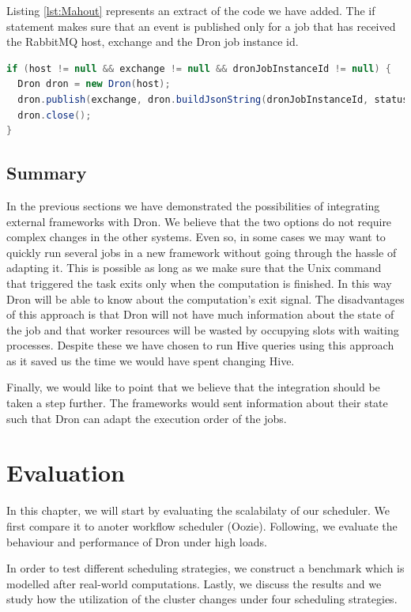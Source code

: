 \documentclass[11pt,a4paper,twoside]{report}
\begin{document}
Listing \ref{lst:Mahout} represents an extract of the code we have added. The if statement makes sure that an event is published only for a job that has received the RabbitMQ host, exchange and the Dron job instance id. 
\\

\begin{lstlisting}[language=Java,caption={Excerpt of Mahout Adaptation},
label={lst:Mahout}]
if (host != null && exchange != null && dronJobInstanceId != null) {
  Dron dron = new Dron(host);
  dron.publish(exchange, dron.buildJsonString(dronJobInstanceId, status));
  dron.close();
}
\end{lstlisting}

\section{Summary}
In the previous sections we have demonstrated the possibilities of integrating external frameworks with Dron. We believe that the two options do not require complex changes in the other systems. Even so, in some cases we may want to quickly run several jobs in a new framework without going through the hassle of adapting it. This is possible as long as we make sure that the Unix command that triggered the task exits only when the computation is finished. In this way Dron will be able to know about the computation's exit signal. The disadvantages of this approach is that Dron will not have much information about the state of the job and that worker resources will be wasted by occupying slots with waiting processes. Despite these we have chosen to run Hive queries using this approach as it saved us the time we would have spent changing Hive. 


Finally, we would like to point that we believe that the integration should be taken a step further. The frameworks would sent information about their state such that Dron can adapt the execution order of the jobs.



\chapter{Evaluation}
\label{chap:Evaluation}
In this chapter, we will start by evaluating the scalabilaty of our scheduler. We first compare it to anoter workflow scheduler (Oozie). Following, we evaluate the behaviour and performance of Dron under high loads.


In order to test different scheduling strategies, we construct a benchmark which is modelled after real-world computations. Lastly, we discuss the results and we study how the utilization of the cluster changes under four scheduling strategies.
\end{document}
